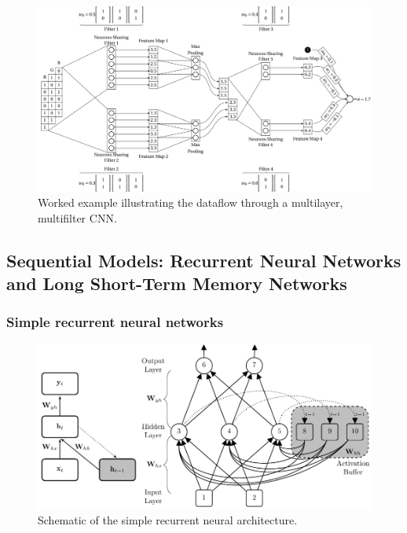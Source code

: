 \documentclass[xcolor={table}]{beamer}
\begin{document}
 \begin{frame} 
\begin{figure}
\includegraphics[width=\textwidth]{./images/fmlpda_8_36.pdf}
\caption{Worked example illustrating the dataflow through a multilayer, multifilter CNN.}
\label{fig:cnn-multilayer-multifilter}
\end{figure}
\end{frame} 


\subsection{Sequential Models: Recurrent Neural Networks and Long Short-Term Memory Networks}

\subsubsection{Simple recurrent neural networks}

 \begin{frame} 
\begin{figure}[t]
\centerline{
\includegraphics[width=\textwidth]{./images/fmlpda_8_37.pdf}
}
\caption[Schematic of the simple recurrent neural architecture.]{Schematic of the simple recurrent neural architecture.}
\label{fig:rnn-architecture}
\end{figure}
\end{frame} 
\end{document}
